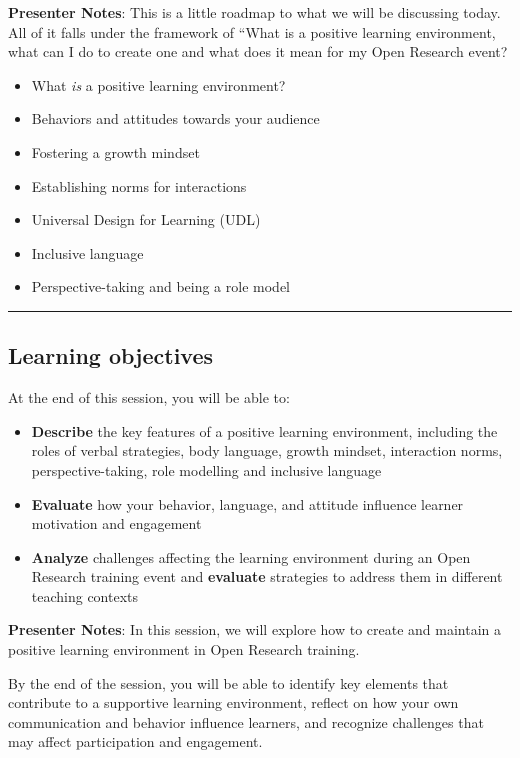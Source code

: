 \documentclass[
  letterpaper,
  DIV=11,
  numbers=noendperiod]{scrartcl}
\providecommand{\tightlist}{%
  \setlength{\itemsep}{0pt}\setlength{\parskip}{0pt}}
\begin{document}
\textbf{Presenter Notes}: This is a little roadmap to what we will be
discussing today. All of it falls under the framework of ``What is a
positive learning environment, what can I do to create one and what does
it mean for my Open Research event?

\begin{itemize}
\tightlist
\item
  What \emph{is} a positive learning environment?
\item
  Behaviors and attitudes towards your audience
\item
  Fostering a growth mindset
\item
  Establishing norms for interactions
\item
  Universal Design for Learning (UDL)
\item
  Inclusive language
\item
  Perspective-taking and being a role model
\end{itemize}

\begin{center}\rule{0.5\linewidth}{0.5pt}\end{center}

\subsection{Learning objectives}\label{learning-objectives}

At the end of this session, you will be able to:

\begin{itemize}
\tightlist
\item
  \textbf{Describe} the key features of a positive learning environment,
  including the roles of verbal strategies, body language, growth
  mindset, interaction norms, perspective-taking, role modelling and
  inclusive language
\item
  \textbf{Evaluate} how your behavior, language, and attitude influence
  learner motivation and engagement
\item
  \textbf{Analyze} challenges affecting the learning environment during
  an Open Research training event and \textbf{evaluate} strategies to
  address them in different teaching contexts
\end{itemize}

\textbf{Presenter Notes}: In this session, we will explore how to create
and maintain a positive learning environment in Open Research training.

By the end of the session, you will be able to identify key elements
that contribute to a supportive learning environment, reflect on how
your own communication and behavior influence learners, and recognize
challenges that may affect participation and engagement.
\end{document}
